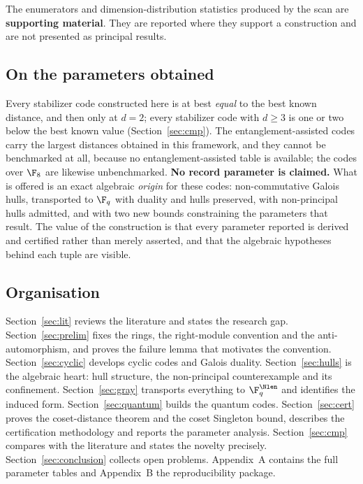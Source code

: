 The enumerators and dimension-distribution statistics produced by the scan are
\textbf{supporting material}. They are reported where they support a
construction and are not presented as principal results.

\subsection{On the parameters obtained}
\label{subsec:parametersposition}

Every stabilizer code constructed here is at best \emph{equal} to the best
known distance, and then only at $d=2$; every stabilizer code with $d\ge3$ is
one or two below the best known value (Section~\ref{sec:cmp}). The
entanglement-assisted codes carry the largest distances obtained in this
framework, and they cannot be benchmarked at all, because no
entanglement-assisted table is available; the codes over $\F_8$ are likewise
unbenchmarked. \textbf{No record parameter is claimed.} What is offered is an
exact algebraic \emph{origin} for these codes: non-commutative Galois hulls,
transported to $\F_q$ with duality and hulls preserved, with non-principal
hulls admitted, and with two new bounds constraining the parameters that
result. The value of the construction is that every parameter reported is
derived and certified rather than merely asserted, and that the algebraic
hypotheses behind each tuple are visible.


\subsection{Organisation}

Section~\ref{sec:lit} reviews the literature and states the research gap.
Section~\ref{sec:prelim} fixes the rings, the right-module convention and the
anti-automorphism, and proves the failure lemma that motivates the convention.
Section~\ref{sec:cyclic} develops cyclic codes and Galois duality.
Section~\ref{sec:hulls} is the algebraic heart: hull structure, the
non-principal counterexample and its confinement.
Section~\ref{sec:gray} transports everything to $\F_q^{\Nlen}$ and identifies
the induced form. Section~\ref{sec:quantum} builds the quantum codes.
Section~\ref{sec:cert} proves the coset-distance theorem and the coset Singleton
bound, describes the certification methodology and reports the parameter
analysis. Section~\ref{sec:cmp} compares with the literature and states the
novelty precisely. Section~\ref{sec:conclusion} collects open problems. Appendix~A
contains the full parameter tables and Appendix~B the reproducibility package.

